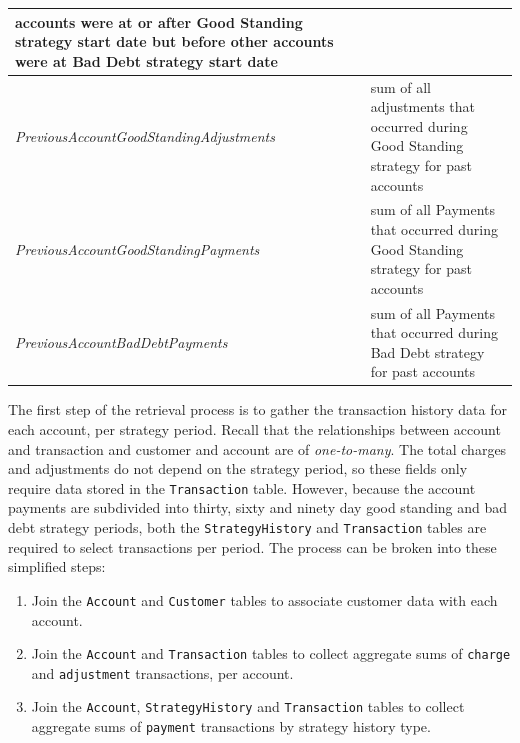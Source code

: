 {\begin{table}[ht]
{\begin{tabular}{|l|p{7.5cm}|}
  accounts were at or after Good Standing strategy start date but before
  other accounts were at Bad Debt strategy start date\\
  \hline
  \textit{PreviousAccountGoodStandingAdjustments} & sum of all adjustments that
  occurred during Good Standing strategy for past accounts\\
  \hline
  \textit{PreviousAccountGoodStandingPayments} & sum of all Payments that
  occurred during Good Standing strategy for past accounts\\
  \hline
  \textit{PreviousAccountBadDebtPayments} & sum of all Payments that occurred
  during Bad Debt strategy for past accounts\\	
   \hline
  \end{tabular}
  }
 \end{table}
}

The first step of the retrieval process is to gather the transaction history data for each account, per strategy period. Recall that the relationships between account and transaction and customer and account are of \textit{one-to-many}. The total charges and adjustments do not depend on the strategy period, so these fields only require data stored in the \texttt{Transaction} table. However, because the account payments are subdivided into thirty, sixty and ninety day good standing and bad debt strategy periods, both the \texttt{StrategyHistory} and \texttt{Transaction} tables are required to select transactions per period. The process can be broken into these simplified steps:
\begin{enumerate}
 \item Join the \texttt{Account} and \texttt{Customer} tables to associate customer data with each account.
 \item Join the \texttt{Account} and \texttt{Transaction} tables to collect aggregate sums of \texttt{charge} and \texttt{adjustment} transactions, per account.
 \item Join the \texttt{Account}, \texttt{StrategyHistory} and \texttt{Transaction} tables to collect aggregate sums of \texttt{payment} transactions by strategy history type.
\end{enumerate}

